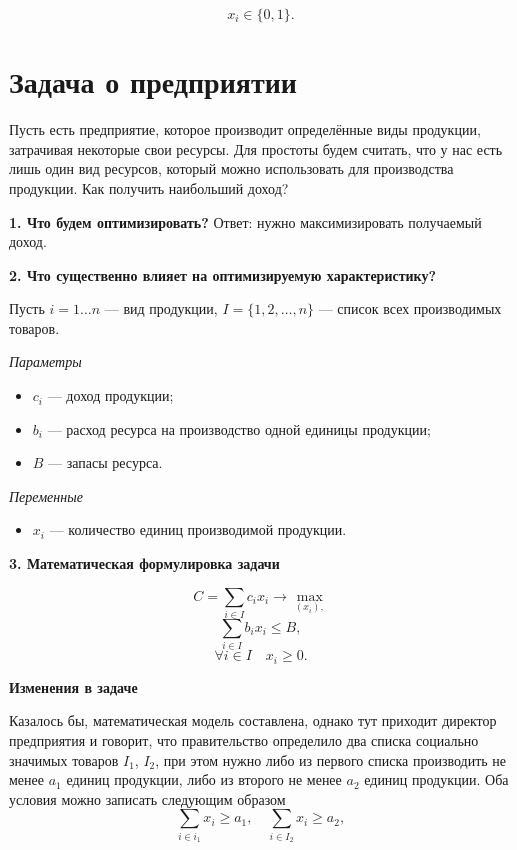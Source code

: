\[
x_i \in \{0, 1\}.
\]

\section{Задача о предприятии}

\problem[о предприятии]

Пусть есть предприятие, которое производит определённые виды продукции, затрачивая некоторые свои ресурсы. Для простоты будем считать, что у нас есть лишь один вид ресурсов, который можно использовать для производства продукции. Как получить наибольший доход?

\mathmodel

\textbf{1. Что будем оптимизировать?} Ответ: нужно максимизировать получаемый доход.

\bigskip

\textbf{2. Что существенно влияет на оптимизируемую характеристику?}

Пусть $i = 1 \dots n$ --- вид продукции, $I = \{1, 2, \dots, n\}$ --- список всех производимых товаров.

\bigskip

\textit{Параметры}

\begin{itemize}[nosep]
	\item $c_i$ --- доход продукции;
		
	\item $b_i$ --- расход ресурса на производство одной единицы продукции;
	
	\item $B$ --- запасы ресурса.
\end{itemize}

\bigskip

\textit{Переменные}
\begin{itemize}[nosep]
	\item $x_i$ --- количество единиц производимой продукции.
\end{itemize}

\bigskip

\textbf{3. Математическая формулировка задачи}

\[
C = \sum_{i \in I}c_i x_i \to \max_{(x_i),}
\]
\[
\sum_{i \in I}b_i x_i \le B,
\]
\[
\forall i \in I \quad x_i \ge 0.
\]

\textbf{Изменения в задаче}

Казалось бы, математическая модель составлена, однако тут приходит директор предприятия и говорит, что правительство определило два списка социально значимых товаров $I_1$, $I_2$, при этом нужно либо из первого списка производить не менее $a_1$ единиц продукции, либо из второго не менее $a_2$ единиц продукции. Оба условия можно записать следующим образом
\[
\sum_{i \in i_1} x_i \ge a_1, \quad \sum_{i \in I_2} x_i \ge a_2,
\]

